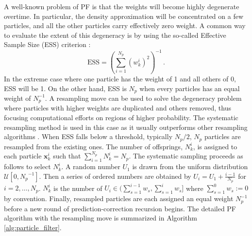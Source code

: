 A well-known problem of PF is that the weights will become highly degenerate overtime. In particular, the density approximation will be concentrated on a few particles, and all the other particles carry effectively zero weight. A common way to evaluate the extent of this degeneracy is by using the so-called Effective Sample Size (ESS) criterion \cite{liu2008monte}:
\begin{equation}
\text{ESS}=\left(\sum_{i=1}^{N_{p}}\left(w_k^{i}\right)^{2}\right)^{-1} \,.
\end{equation}
In the extreme case where one particle has the weight of 1 and all others of 0, ESS will be 1. On the other hand, ESS is $N_p$ when every particles has an equal weight of $N_p^{-1}$.
A resampling move can be used to solve the degeneracy problem where particles with higher weights are duplicated and others removed, thus focusing computational efforts on regions of higher probability. The systematic resampling method is used in this case as it usually outperforms other resampling algorithms \cite{doucet2009tutorial}. When ESS falls below a threshold, typically $N_p/2$, $N_p$ particles are resampled from the existing ones. The number of offsprings, $N_k^{i}$, is assigned to each particle $\boldsymbol{x}_k^i$ such that $\sum_{i=1}^{N_p}N_k^{i} = N_p$. The systematic sampling proceeds as follows to select $N_k^{i}$. A random number $U_{1}$ is drawn from the uniform distribution $\mathcal{U}\left[0, {N_p}^{-1}\right]$. Then a series of ordered numbers are obtained by $U_{i}=U_{1}+\frac{i-1}{N_p}$ for $i=2, \ldots, N_p$. $N_k^{i}$ is the number of $U_{i} \in(\sum_{s=1}^{i-1} w_{s}, \sum_{s=1}^{i} w_{s}]$ where $\sum_{s=1}^{0} w_{s} := 0$ by convention. Finally, resampled particles are each assigned an equal weight $N_{p}^{-1}$ before a new round of prediction-correction recursion begins. The detailed PF algorithm with the resampling move is summarized in Algorithm \ref{alg:particle_filter}.
